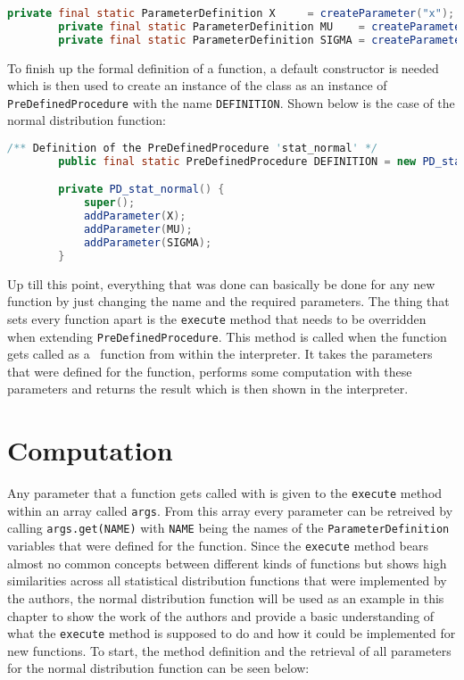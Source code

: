 \begin{center}
	\begin{lstlisting}[caption={Parameter Definition}, language={java}, label=lis:exampleCode]
		private final static ParameterDefinition X     = createParameter("x");
		private final static ParameterDefinition MU    = createParameter("mu");
		private final static ParameterDefinition SIGMA = createParameter("sigma");
	\end{lstlisting}
\end{center}

To finish up the formal definition of a function, a default constructor is needed which is then used to create an instance of the class as an instance of \lstinline{PreDefinedProcedure} with the name \lstinline{DEFINITION}. Shown below is the case of the normal distribution function:

\begin{center}
	\begin{lstlisting}[caption={Constructor and Function Definition}, language={java}, label=lis:exampleCode]
		/** Definition of the PreDefinedProcedure 'stat_normal' */
		public final static PreDefinedProcedure DEFINITION = new PD_stat_normal();

		private PD_stat_normal() {
			super();
			addParameter(X);
			addParameter(MU);
			addParameter(SIGMA);
		}
	\end{lstlisting}
\end{center}

Up till this point, everything that was done can basically be done for any new function by just changing the name and the required parameters. The thing that sets every function apart is the \lstinline{execute} method that needs to be overridden when extending \lstinline{PreDefinedProcedure}. This method is called when the function gets called as a \setlx\ function from within the interpreter. It takes the parameters that were defined for the function, performs some computation with these parameters and returns the result which is then shown in the interpreter.

\section{Computation}

Any parameter that a function gets called with is given to the \lstinline{execute} method within an array called \lstinline{args}. From this array every parameter can be retreived by calling \lstinline{args.get(NAME)} with \lstinline{NAME} being the names of the \lstinline{ParameterDefinition} variables that were defined for the function. Since the \lstinline{execute} 
method bears almost no common concepts between different kinds of functions but shows high similarities across all statistical distribution functions that were implemented by the authors, the normal distribution function will be used as an example in this chapter to show the work of the authors and provide a basic understanding of what the \lstinline{execute} method is supposed to do and how it could be implemented for new functions. To start, the method definition and the retrieval of all parameters for the normal distribution function can be seen below:

